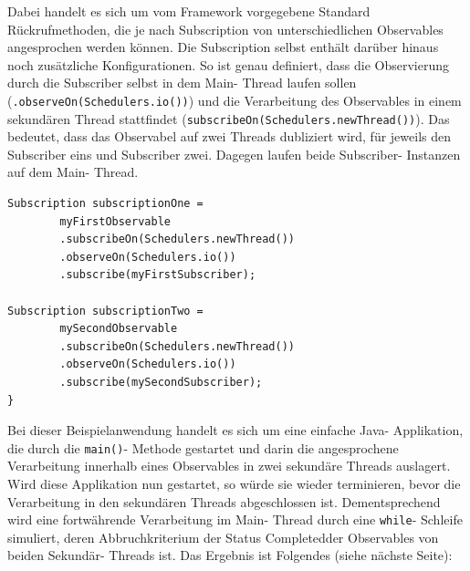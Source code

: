 \documentclass[12pt,oneside,a4paper,bibtotoc,liststotoc]{scrreprt}
\begin{document}
Dabei handelt es sich um vom Framework vorgegebene Standard Rückrufmethoden, die je nach Subscription von unterschiedlichen Observables angesprochen werden können. Die Subscription selbst enthält darüber hinaus noch zusätzliche Konfigurationen. So ist genau definiert, dass die Observierung durch die Subscriber selbst in dem Main- Thread laufen sollen (\texttt{.observeOn(Schedulers.io())}) und die Verarbeitung des Observables in einem sekundären Thread stattfindet (\texttt{subscribeOn(Schedulers.newThread())}). Das bedeutet, dass das Observabel auf zwei Threads dubliziert wird, für jeweils den Subscriber eins und 
Subscriber zwei. Dagegen laufen beide Subscriber- Instanzen auf dem Main- Thread.\newpage
\begin{lstlisting}
Subscription subscriptionOne = 
        myFirstObservable
        .subscribeOn(Schedulers.newThread())
        .observeOn(Schedulers.io())
        .subscribe(myFirstSubscriber);

Subscription subscriptionTwo = 
        mySecondObservable
        .subscribeOn(Schedulers.newThread())
        .observeOn(Schedulers.io())
        .subscribe(mySecondSubscriber);
}
\end{lstlisting}
Bei dieser Beispielanwendung handelt es sich um eine einfache Java- Applikation, die durch die \texttt{main()}- Methode gestartet und darin die angesprochene Verarbeitung innerhalb eines Observables in zwei sekundäre Threads auslagert. Wird diese Applikation nun gestartet, so würde sie wieder terminieren, bevor die Verarbeitung in den sekundären Threads abgeschlossen ist. Dementsprechend wird eine fortwährende Verarbeitung im Main- Thread durch eine \texttt{while}- Schleife simuliert, deren Abbruchkriterium der Status \glqq Completed\grqq  der Observables von beiden Sekundär- Threads ist. Das Ergebnis ist Folgendes (siehe nächste Seite):\newpage
\end{document}
